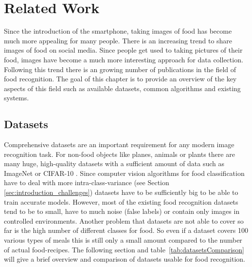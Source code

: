 
\chapter{Related Work}
\label{ch:relWork}
Since the introduction of the smartphone, taking images of food has become much more appealing for many people. There is an increasing trend to share images of food on social media. Since people get used to taking pictures of their food, images have become a much more interesting approach for data collection. Following this trend there is an growing number of publications in the field of food recognition. The goal of this chapter is to provide an overview of the key aspects of this field such as available datasets, common algorithms and existing systems.

\section{Datasets}
\label{sec:relWork_Datasets}
Comprehensive datasets are an important requirement for any modern image recognition task. For non-food objects like planes, animals or plants there are many huge, high-quality datasets with a sufficient amount of data such as ImageNet \cite{Russakovsky2015} or CIFAR-10 \cite{Krizhevsky2009}. Since computer vision algorithms for food classification have to deal with more intra-class-variance {(see Section \ref{sec:introduction_challenges})} datasets have to be sufficiently big to be able to train accurate models. However, most of the existing food recognition datasets tend to be to small, have to much noise {(false labels)} or contain only images in controlled environments. Another problem that datasets are not able to cover so far is the high number of different classes for food. So even if a dataset covers 100 various types of meals this is still only a small amount compared to the number of actual food-recipes. The following section and table~\ref{tab:datasetsComparison} will give a brief overview and comparison of datasets usable for food recognition.

